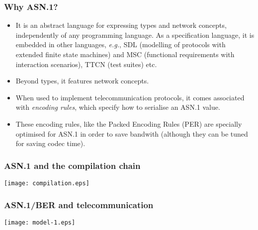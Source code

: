 \documentclass[compress,dvips,xcolor={dvipsnames},t]{beamer}
\newcommand\ASN{\textsf{ASN.1}\xspace}
\begin{document}
\begin{frame}
\frametitle{Why \ASN?}

\begin{itemize}

\item It is an abstract language for expressing types and network
  concepts, independently of any programming language. As a
  specification language, it is embedded in other languages,
  \emph{e.g.}, \textsf{SDL} (modelling of protocols with extended
  finite state machines) and \textsf{MSC} (functional requirements
  with interaction scenarios), \textsf{TTCN} (test suites) etc.

 \item Beyond types, it features network concepts.

\item When used to implement telecommunication protocols, it comes
  associated with \emph{encoding rules}, which specify how to
  serialise an \ASN value.

  \item These encoding rules, like the Packed Encoding Rules
  (\textsf{PER}) are specially optimised for \ASN in order to save
  bandwith (although they can be tuned for saving codec time).

\end{itemize}

\end{frame}


\begin{frame}
\frametitle{\ASN and the compilation chain}

\begin{center}
\texttt{[image: compilation.eps]}
\end{center}

\end{frame}


\begin{frame}
\frametitle{\ASN/BER and telecommunication}

\begin{center}
\texttt{[image: model-1.eps]}
\end{center}

\end{frame}
\end{document}

